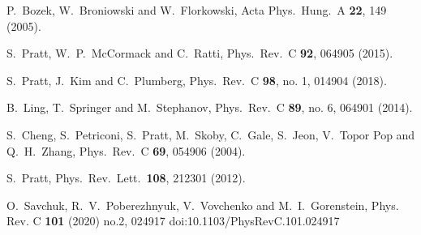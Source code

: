 \begin{thebibliography}{99}
  P.~Bozek, W.~Broniowski and W.~Florkowski,
  Acta Phys.\ Hung.\ A {\bf 22}, 149 (2005).
 
  S.~Pratt, W.~P.~McCormack and C.~Ratti,
  Phys.\ Rev.\ C {\bf 92}, 064905 (2015).

  S.~Pratt, J.~Kim and C.~Plumberg,
  Phys.\ Rev.\ C {\bf 98}, no. 1, 014904 (2018).

  B.~Ling, T.~Springer and M.~Stephanov,
  Phys.\ Rev.\ C {\bf 89}, no. 6, 064901 (2014).


  S.~Cheng, S.~Petriconi, S.~Pratt, M.~Skoby, C.~Gale, S.~Jeon, V.~Topor Pop and Q.~H.~Zhang,
  Phys.\ Rev.\ C {\bf 69}, 054906 (2004).

  S.~Pratt,
  Phys.\ Rev.\ Lett.\  {\bf 108}, 212301 (2012).

O.~Savchuk, R.~V.~Poberezhnyuk, V.~Vovchenko and M.~I.~Gorenstein,
Phys. Rev. C \textbf{101} (2020) no.2, 024917
doi:10.1103/PhysRevC.101.024917


\end{thebibliography}
